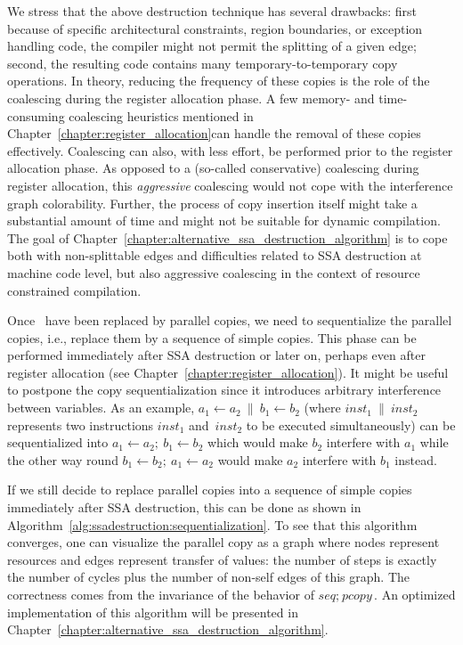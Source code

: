 {We stress that the above destruction technique has several drawbacks: 
first because of specific architectural constraints, region boundaries, or exception handling code, the compiler might not permit the splitting of a given edge; 
second, the resulting code contains many temporary-to-temporary copy operations. 
In theory, reducing the frequency of these copies is the role of the coalescing during the register allocation phase. 
A few memory- and time-consuming coalescing heuristics \ifregin mentioned in Chapter~\ref{chapter:register_allocation}\fi can handle the removal of these copies effectively. 
Coalescing can also, with less effort, be performed prior to the register allocation phase. 
As opposed to a (so-called conservative) coalescing during register allocation, this \emph{aggressive} coalescing would not cope with the interference graph colorability. 
Further, the process of copy insertion itself might take a substantial amount of time and might not be suitable for dynamic compilation. 
The goal of Chapter~\ref{chapter:alternative_ssa_destruction_algorithm} is to cope both with non-splittable edges and difficulties related to SSA destruction at machine code level, but also aggressive coalescing in the context of resource constrained compilation.

Once \phifuns\ have been replaced by parallel copies, we need to sequentialize the parallel copies, i.e., replace them by a sequence of simple copies. 
This phase can be performed immediately after SSA destruction or later on, perhaps even after register allocation \ifregin (see Chapter~\ref{chapter:register_allocation})\fi. 
It might be useful to postpone the copy sequentialization since it introduces arbitrary interference between variables. 
As an example, $a_1\gets a_2\ \parallel\ b_1\gets b_2$ (where $\textit{inst}_1\ \parallel\ \textit{inst}_2$ represents two instructions $\textit{inst}_1$ and~$\textit{inst}_2$ to be executed simultaneously) can be sequentialized into $a_1\gets a_2;\ b_1\gets b_2$ which would make $b_2$ interfere with $a_1$ while the other way round $b_1\gets b_2;\ a_1\gets a_2$ would make $a_2$ interfere with $b_1$ instead.

If we still decide to replace parallel copies into a sequence of simple copies immediately after SSA destruction, this can be done as shown in Algorithm~\ref{alg:ssadestruction:sequentialization}. To see that this algorithm converges, one can visualize the parallel copy as a graph where nodes represent resources and edges represent transfer of values: 
the number of steps is exactly the number of cycles plus the number of non-self edges of this graph. 
The correctness comes from the invariance of the behavior of $\textit{seq};\ \textit{pcopy}$. 
An optimized implementation of this algorithm will be presented in Chapter~\ref{chapter:alternative_ssa_destruction_algorithm}.

}
